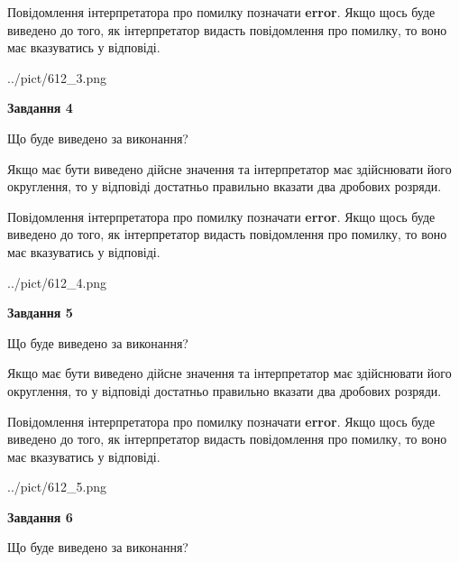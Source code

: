 \documentclass[12pt, ukrainian]{article}
\begin{document}
{\begin {Large}
Повідомлення інтерпретатора про помилку позначати \textbf{error}.
Якщо щось буде виведено до того, як інтерпретатор видасть повідомлення про помилку, 
то воно має вказуватись у відповіді. \par

\begin{center}
	{../pict/612_3.png}
\end{center}
\newpage

{\begin {center}\textbf{Завдання 4}\end {center}}\par
Що буде виведено за виконання? \par

Якщо має бути виведено дійсне значення та інтерпретатор має здійснювати його округлення, 
то у відповіді достатньо правильно вказати два дробових розряди.

Повідомлення інтерпретатора про помилку позначати \textbf{error}.
Якщо щось буде виведено до того, як інтерпретатор видасть повідомлення про помилку, 
то воно має вказуватись у відповіді. \par

\begin{center}
	{../pict/612_4.png}
\end{center}
\newpage

{\begin {center}\textbf{Завдання 5}\end {center}}\par
Що буде виведено за виконання? \par

Якщо має бути виведено дійсне значення та інтерпретатор має здійснювати його округлення, 
то у відповіді достатньо правильно вказати два дробових розряди.

Повідомлення інтерпретатора про помилку позначати \textbf{error}.
Якщо щось буде виведено до того, як інтерпретатор видасть повідомлення про помилку, 
то воно має вказуватись у відповіді. \par

\begin{center}
	{../pict/612_5.png}
\end{center}
\newpage

{\begin {center}\textbf{Завдання 6}\end {center}}\par
Що буде виведено за виконання? \par


\end{Large}}
\end{document}
